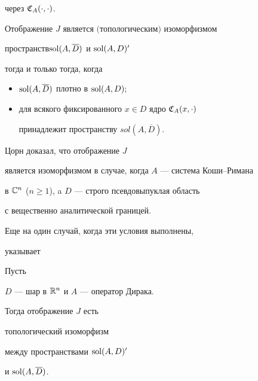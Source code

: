 через ${\frak C}_A(\cdot,\cdot)$.





\begin{thm} \label{t.dual}


Отображение $J$ является $($топологическим$)$ изоморфизмом


пространств\linebreak $\operatorname{sol} (A,\overline D)$ и $\operatorname{sol} (A, D)'$


тогда и только тогда, когда


\begin{itemize}


\item[(i)] $\operatorname{sol}(A,\overline D)$ плотно в $\operatorname{sol}(A,D);$


\item[(ii)]


для всякого фиксированного $x\in D$ ядро ${\frak C}_{A}(x,\cdot)$


принадлежит пространству $sol(A,\overline D)$.


\end{itemize}


\end{thm}





Цорн \cite{Zorn} доказал, что отображение $J$


является изоморфизмом в случае, когда $A$ --- система Коши--Римана


в ${\Bbb C}^n$ ($n\geq1$), a $D$ --- строго псевдовыпуклая область


с вещественно аналитической границей.


Еще на один случай, когда эти условия выполнены,


указывает 





\begin{cor} \label{c.Dirac} Пусть


$D$ --- шар в ${\Bbb R}^n$ и $A$ --- оператор Дирака.


Тогда отображение $J$ есть


топологический изоморфизм


между пространствами $\operatorname{sol} (A, D)^{\prime}$


и $\operatorname{sol} (A , \overline D)$.


\end{cor}





